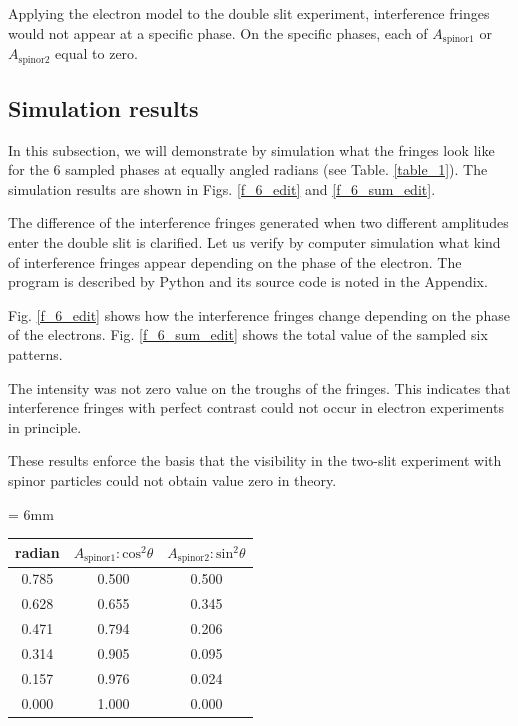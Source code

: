 \documentclass[%
 reprint,
 amsmath,amssymb,
 aps,
]{revtex4-1}
\numberwithin{equation}{section}%
\begin{document}
    Applying the electron model to the double slit experiment, interference fringes would not appear at a specific phase. On the specific phases, each of $A_{\mathrm{spinor1}}$ or $A_{\mathrm{spinor2}}$ equal to zero.


\subsection{\label{sub:Simulation results}Simulation results}


    In this subsection, we will demonstrate by simulation what the fringes look like for the 6 sampled phases at equally angled radians (see Table. \ref{table_1}). The simulation results are shown in Figs. \ref{f_6_edit} and \ref{f_6_sum_edit}.

    The difference of the interference fringes generated when two different amplitudes enter the double slit is clarified. Let us verify by computer simulation what kind of interference fringes appear depending on the phase of the electron. The program is described by Python and its source code is noted in the Appendix.

    Fig. \ref{f_6_edit} shows how the interference fringes change depending on the phase of the electrons. Fig. \ref{f_6_sum_edit} shows the total value of the sampled six patterns.
    
    The intensity was not zero value on the troughs of the fringes. This indicates that interference fringes with perfect contrast could not occur in electron experiments in principle.
    
    These results enforce the basis that the visibility in the two-slit experiment with spinor particles could not obtain value zero in theory.


    \begin{center}
        \begin{threeparttable}
            \caption{Six radians as samples.}
            \label{table_1}
            \tabcolsep = 6mm
            \renewcommand\arraystretch{1.2}
            \begin{tabular}{ccc} \hline
                radian & $A_{\mathrm{spinor1}}:\mathrm{cos^{2}} \theta$ & $A_{\mathrm{spinor2}}:\mathrm{sin^{2}} \theta$ \\ \hline
                0.785 & 0.500 & 0.500 \\
                0.628 & 0.655 & 0.345 \\
                0.471 & 0.794 & 0.206 \\
                0.314 & 0.905 & 0.095 \\
                0.157 & 0.976 & 0.024 \\
                0.000 & 1.000 & 0.000
                \\ \hline
            \end{tabular}
        \end{threeparttable}

    \end{center}
\end{document}
